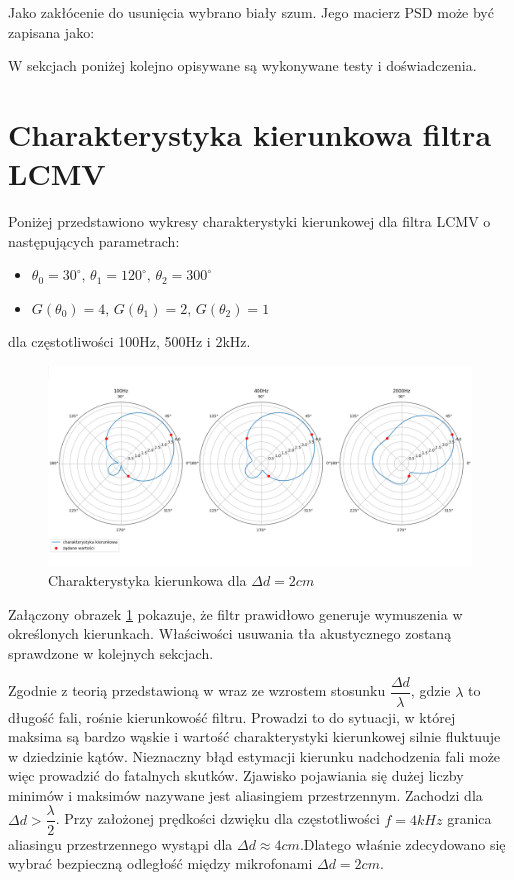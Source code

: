Jako zakłócenie do usunięcia wybrano biały szum. Jego macierz PSD może być zapisana jako:

W sekcjach poniżej kolejno opisywane są wykonywane testy i doświadczenia.

\section{Charakterystyka kierunkowa filtra LCMV}

Poniżej przedstawiono wykresy charakterystyki kierunkowej dla filtra LCMV o następujących parametrach:

\begin{itemize}
    \item $\theta_{0}=30^{\circ}, \,
    \theta_{1}=120^{\circ}, \,
    \theta_{2}=300^{\circ}$
    \item $G(\theta_{0})=4, \,
    G(\theta_{1})=2, \,
    G(\theta_{2})=1$
\end{itemize}
\noindent dla częstotliwości 100Hz, 500Hz i 2kHz.

\begin{figure}[h!]
    \centering
    \includegraphics[width=\textwidth]{Images/directivity0.02m.png}
    \caption{Charakterystyka kierunkowa dla $\Delta d = 2cm$}
    \label{fig:directivity0.02}
\end{figure}

\noindent Załączony obrazek \ref{fig:directivity0.02} pokazuje, że filtr prawidłowo generuje wymuszenia w określonych kierunkach. Właściwości usuwania tła akustycznego zostaną sprawdzone w kolejnych sekcjach.

\noindent Zgodnie z teorią przedstawioną w \cite{mccowan2001} wraz ze wzrostem stosunku $\dfrac{\Delta d}{\lambda}$, gdzie $\lambda$ to długość fali, rośnie kierunkowość filtru. Prowadzi to do sytuacji, w której maksima są bardzo wąskie i wartość charakterystyki kierunkowej silnie fluktuuje w dziedzinie kątów. Nieznaczny błąd estymacji kierunku nadchodzenia fali może więc prowadzić do fatalnych skutków. Zjawisko pojawiania się dużej liczby minimów i maksimów nazywane jest aliasingiem przestrzennym. Zachodzi dla $\Delta d > \dfrac{\lambda}{2}$. Przy założonej prędkości dzwięku dla częstotliwości $f = 4kHz$ granica aliasingu przestrzennego wystąpi dla $\Delta d \approx 4cm $.Dlatego właśnie zdecydowano się wybrać bezpieczną odległość między mikrofonami $\Delta d = 2cm$.


